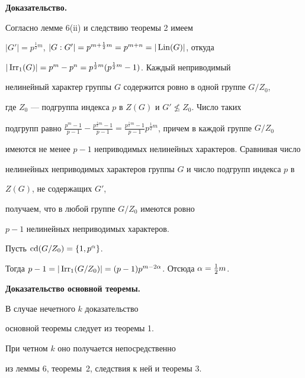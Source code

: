 {\bf Доказательство.}


Согласно лемме 6\;(ii) и следствию теоремы 2 имеем


$|G'|=p^{\frac12m}$, $|G:G'|=p^{m+\frac12m}=p^{m+n}=|\operatorname{Lin}(G)|$, откуда


$|\operatorname{Irr_1}(G)|=p^m-p^n=p^{\frac12m}(p^{\frac12m}-1)$. Каждый неприводимый 


нелинейный характер группы $G$ содержится ровно в одной группе $G/Z_0$, 


где $Z_0$ --- подгруппа индекса $p$ в $Z(G)$ и $G'\not\le Z_0$. Число таких


подгрупп равно $\frac{p^m-1}{p-1}-\frac{p^{\frac12m}-1}{p-1}=


\frac{p^{\frac12m}-1}{p-1}p^{\frac12m}$, причем в каждой группе $G/Z_0$ 


имеются не менее $p-1$ неприводимых нелинейных характеров. Сравнивая число 


нелинейных неприводимых характеров группы $G$ и число подгрупп индекса $p$ в 


$Z(G)$, не содержащих $G'$,


получаем, что в любой группе $G/Z_0$ имеются ровно


$p-1$ нелинейных неприводимых характеров.


Пусть $\operatorname{cd}(G/Z_0)=\lbrace1,p^\alpha\rbrace$.


Тогда $p-1=|\operatorname{Irr_1}(G/Z_0)|=(p-1)p^{m-2\alpha}$. Отсюда $\alpha=\frac12m$.











{\bf Доказательство основной теоремы.}


В случае нечетного $k$ доказательство 


основной теоремы следует из теоремы 1. 


При четном $k$ оно получается непосредственно


из леммы 6, теоремы~2, следствия к ней и теоремы 3.








